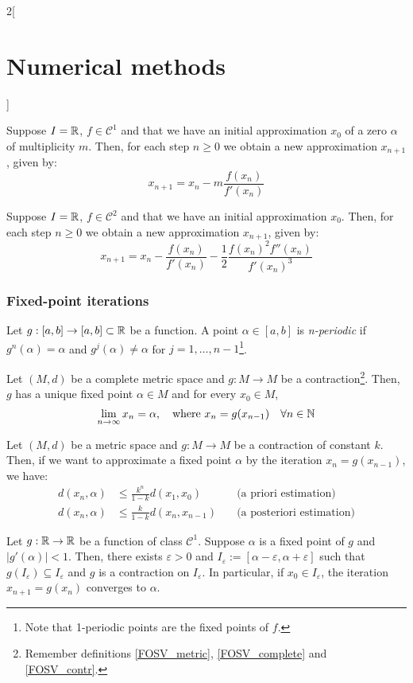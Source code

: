 \documentclass[../../../main.tex]{subfiles}
\begin{document}
\begin{multicols}{2}[\section{Numerical methods}]
\begin{method}
\end{method}
\begin{method}
    Suppose $I=\mathbb{R}$, $f\in\mathcal{C}^1$ and that we have an initial approximation $x_0$ of a zero $\alpha$ of multiplicity $m$. Then, for each step $n\geq 0$ we obtain a new approximation $x_{n+1}$, given by: $$x_{n+1}=x_n-m\frac{f(x_n)}{f'(x_n)}$$
\end{method}
\begin{method}
    Suppose $I=\mathbb{R}$, $f\in\mathcal{C}^2$ and that we have an initial approximation $x_0$. Then, for each step $n\geq 0$ we obtain a new approximation $x_{n+1}$, given by: $$x_{n+1}=x_n-\frac{f(x_n)}{f'(x_n)}-\frac{1}{2}\frac{{f(x_n)}^2f''(x_n)}{{f'(x_n)}^3}$$
\end{method}
\subsubsection*{Fixed-point iterations}
\begin{definition}
    Let $g:[a,b]\rightarrow[a,b]\subset\mathbb{R}$ be a function. A point $\alpha\in[a,b]$ is \textit{n-periodic} if $g^n(\alpha)=\alpha$ and $g^j(\alpha)\ne\alpha$ for $j=1,\ldots,n-1$\footnote{Note that 1-periodic points are the fixed points of $f$.}.
\end{definition}
\begin{theorem}
    Let $(M,d)$ be a complete metric space and $g:M\rightarrow M$ be a contraction\footnote{Remember definitions \ref{FOSV_metric}, \ref{FOSV_complete} and \ref{FOSV_contr}.}. Then, $g$ has a unique fixed point $\alpha\in M$ and for every $x_0\in M$, $$\lim_{n\to\infty}x_n=\alpha,\quad\text{where }x_n=g(x_{n-1})\quad\forall n\in\mathbb{N}$$
\end{theorem}
\begin{prop}
    Let $(M,d)$ be a metric space and $g:M\rightarrow M$ be a contraction of constant $k$. Then, if we want to approximate a fixed point $\alpha$ by the iteration $x_n=g(x_{n-1})$, we have:
    \begin{align*}
        d(x_n,\alpha)&\leq\frac{k^n}{1-k}d(x_1,x_0)\quad&\text{(a priori estimation)}\\
        d(x_n,\alpha)&\leq\frac{k}{1-k}d(x_n,x_{n-1})\quad&\text{(a posteriori estimation)}
    \end{align*}
\end{prop}
\begin{corollary}
    Let $g:\mathbb{R}\rightarrow\mathbb{R}$ be a function of class $\mathcal{C}^1$. Suppose $\alpha$ is a fixed point of $g$ and $|g'(\alpha)|<1$. Then, there exists $\varepsilon>0$ and $I_\varepsilon:=[\alpha-\varepsilon,\alpha+\varepsilon]$ such that $g(I_\varepsilon)\subseteq I_\varepsilon$ and $g$ is a contraction on $I_\varepsilon$. In particular, if $x_0\in I_\varepsilon$, the iteration $x_{n+1}=g(x_n)$ converges to $\alpha$.

\end{corollary}
\end{multicols}
\end{document}
